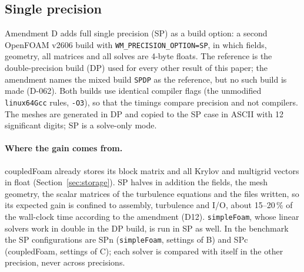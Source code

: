\documentclass[11pt,a4paper]{article}
\newcommand{\code}[1]{\texttt{#1}}
\begin{document}
\clearpage
\subsection{Single precision}\label{sec:sp}

Amendment D adds full single precision (SP) as a build option: a second
OpenFOAM v2606 build with \code{WM\_PRECISION\_OPTION=SP}, in which fields,
geometry, all matrices and all solves are 4-byte floats. The reference is
the double-precision build (DP) used for every other result of this paper;
the amendment names the mixed build \code{SPDP} as the reference, but no
such build is made (D-062). Both builds use identical compiler flags (the
unmodified \code{linux64Gcc} rules, \code{-O3}), so that the timings compare
precision and not compilers. The meshes are generated in DP and copied to
the SP case in ASCII with 12 significant digits; SP is a solve-only mode.

\paragraph{Where the gain comes from.} coupledFoam already stores its block
matrix and all Krylov and multigrid vectors in float
(Section~\ref{sec:storage}). SP halves in addition the fields, the mesh
geometry, the scalar matrices of the turbulence equations and the files
written, so its expected gain is confined to assembly, turbulence and I/O,
about 15--20\,\% of the wall-clock time according to the amendment (D12).
\code{simpleFoam}, whose linear solvers work in double in the DP build, is
run in SP as well. In the benchmark the SP configurations are SPn
(\code{simpleFoam}, settings of B) and SPc (coupledFoam, settings of C);
each solver is compared with itself in the other precision, never across
precisions.
\end{document}
